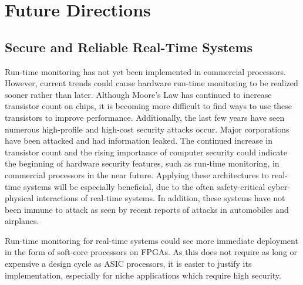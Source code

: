 
\section{Future Directions}

\subsection{Secure and Reliable Real-Time Systems}

Run-time monitoring has not yet been implemented in commercial processors.
However, current trends could cause hardware run-time monitoring to be realized
sooner rather than later. Although Moore's Law has continued to increase
transistor count on chips, it is becoming more difficult to find ways to use
these transistors to improve performance. Additionally, the last few years have
seen numerous high-profile and high-cost security attacks occur. Major
corporations have been attacked and had information leaked. The continued
increase in transistor count and the rising importance of computer security
could indicate the beginning of hardware security features, such as run-time
monitoring, in commercial processors in the near future. Applying these
architectures to real-time systems will be especially beneficial, due to the
often safety-critical cyber-physical interactions of real-time systems.  In
addition, these systems have not been immune to attack as seen by recent
reports of attacks in automobiles and airplanes. 

Run-time monitoring for real-time systems could see more immediate deployment
in the form of soft-core processors on FPGAs. As this does not require as long
or expensive a design cycle as ASIC processors, it is easier to justify its
implementation, especially for niche applications which require high security.

